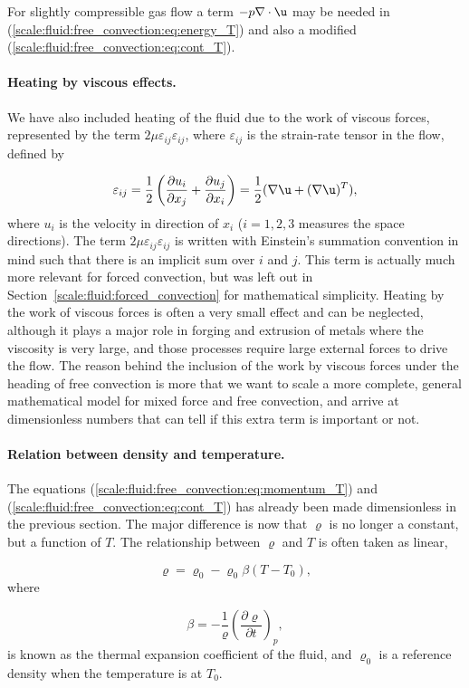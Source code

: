 \documentclass[graybox,envcountchap,sectrefs,final]{svmonodo}
\begin{document}
For slightly compressible gas flow a term $-p\nabla\cdot\u$ may be
needed in (\ref{scale:fluid:free_convection:eq:energy_T}) and also
a modified (\ref{scale:fluid:free_convection:eq:cont_T}).

\paragraph{Heating by viscous effects.}
We have also included heating of the fluid due to the work of viscous forces,
represented by the term $2\mu\varepsilon_{ij}\varepsilon_{ij}$, where
$\varepsilon_{ij}$ is the strain-rate tensor in the flow, defined by

\[ \varepsilon_{ij} = \frac{1}{2}\left(\frac{\partial u_i}{\partial x_j}
+ \frac{\partial u_j}{\partial x_i}\right) = \frac{1}{2}(\nabla\u + (\nabla\u)^T),\]
where $u_i$ is the velocity in direction of $x_i$ ($i=1,2,3$ measures
the space directions). The term $2\mu\varepsilon_{ij}\varepsilon_{ij}$
is written with Einstein's summation convention in mind such that
there is an implicit sum over $i$ and $j$.  This term is actually much
more relevant for forced convection, but was left out in Section~\ref{scale:fluid:forced_convection} for mathematical simplicity.
Heating by the work of viscous forces is often a very small effect and
can be neglected, although it plays a major role in forging and
extrusion of metals where the viscosity is very large, and those
processes require large external forces to drive the flow.  The reason
behind the inclusion of the work by viscous forces under the heading
of free convection is more that we want to scale a more complete,
general mathematical model for mixed force and free convection, and
arrive at dimensionless numbers that can tell if this extra term is
important or not.

\paragraph{Relation between density and temperature.}
The equations (\ref{scale:fluid:free_convection:eq:momentum_T}) and
(\ref{scale:fluid:free_convection:eq:cont_T}) has already been made dimensionless
in the previous section. The major difference is now that $\varrho$
is no longer a constant, but a function of $T$.
The relationship between $\varrho$ and $T$ is often taken as
linear,

\[ \varrho = \varrho_0 -\varrho_0 \beta (T-T_0),\]
where

\[ \beta = -\frac{1}{\varrho}\left(\frac{\partial\varrho}{\partial t}
\right)_p,\]
is known as the thermal expansion coefficient of the fluid,
and $\varrho_0$ is a reference density when the temperature is at $T_0$.
\end{document}
